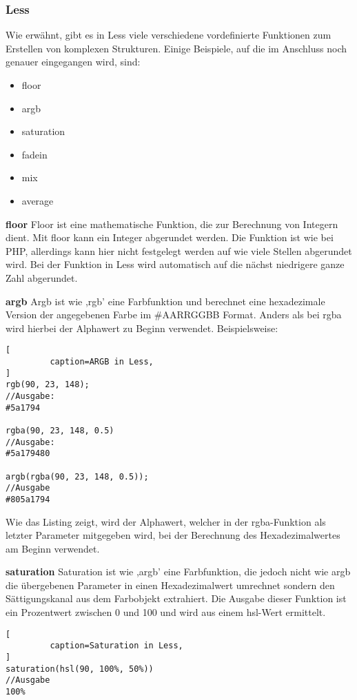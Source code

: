 \subsubsection{Less}
Wie erwähnt, gibt es in Less viele verschiedene vordefinierte Funktionen zum Erstellen von komplexen Strukturen. Einige Beispiele, auf die im Anschluss noch genauer eingegangen wird, sind:
\begin{itemize}
  \item{floor}
  \item{argb}
  \item{saturation}
  \item{fadein}
  \item{mix}
  \item{average}
\end{itemize}
\textbf{floor}\newline
Floor ist eine mathematische Funktion, die zur Berechnung von Integern dient. Mit floor kann ein Integer abgerundet werden. Die Funktion ist wie bei PHP, allerdings kann hier nicht festgelegt werden auf wie viele Stellen abgerundet wird. Bei der Funktion in Less wird automatisch auf die nächst niedrigere ganze Zahl abgerundet.

\textbf{argb}\newline
Argb ist wie ,rgb' eine Farbfunktion und berechnet eine hexadezimale  Version der angegebenen Farbe im \#AARRGGBB Format. Anders als bei rgba wird hierbei der Alphawert zu Beginn verwendet. Beispielsweise:
\begin{lstlisting}[
         caption=ARGB in Less,
]
rgb(90, 23, 148);
//Ausgabe:
#5a1794

rgba(90, 23, 148, 0.5)
//Ausgabe:
#5a179480

argb(rgba(90, 23, 148, 0.5));
//Ausgabe
#805a1794
\end{lstlisting}
Wie das Listing zeigt, wird der Alphawert, welcher in der rgba-Funktion als letzter Parameter mitgegeben wird, bei der Berechnung des Hexadezimalwertes am Beginn verwendet. 

\textbf{saturation}\newline
Saturation ist wie ,argb' eine Farbfunktion, die jedoch nicht wie argb die übergebenen Parameter in einen Hexadezimalwert umrechnet sondern den Sättigungskanal aus dem Farbobjekt extrahiert. Die Ausgabe dieser Funktion ist ein Prozentwert zwischen 0 und 100 und wird aus einem hsl-Wert ermittelt.
\begin{lstlisting}[
         caption=Saturation in Less,
]
saturation(hsl(90, 100%, 50%))
//Ausgabe
100%
\end{lstlisting}

